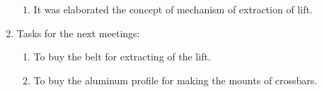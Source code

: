 \begin{enumerate}
\begin{enumerate}
      \item It was elaborated the concept of mechanism of extraction of lift.
      
    \end{enumerate}
    
	\item Tasks for the next meetings:
	\begin{enumerate}
	  \item To buy the belt for extracting of the lift.
	  
	  \item To buy the aluminum profile for making the mounts of crossbars.
	  
    \end{enumerate}     
\end{enumerate}
\fillpage
